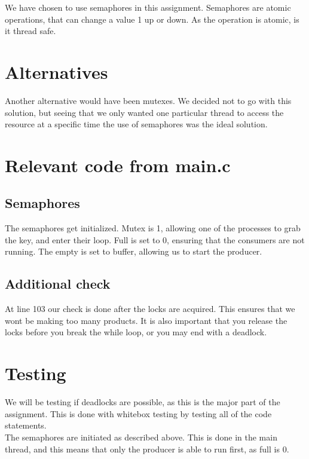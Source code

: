 We have chosen to use semaphores in this assignment. Semaphores are atomic operations, that can change a value 1 up or down. As the operation is atomic, is it thread safe.

\section{Alternatives}
Another alternative would have been mutexes. We decided not to go with this solution, but seeing that we only wanted one particular thread to access the resource at a specific time the use of semaphores was the ideal solution.

\section{Relevant code from main.c}
\subsection{Semaphores}
The semaphores get initialized.	
Mutex is 1, allowing one of the processes to grab the key, and enter their loop. Full is set to 0, ensuring that the consumers are not running. The empty is set to buffer, allowing us to start the producer.\\



\subsection{Additional check}
At line 103 our check is done after the locks are acquired. This ensures that we wont be making too many products. It is also important that you release the locks before you break the while loop, or you may end with a deadlock.




\section{Testing}

We will be testing if deadlocks are possible, as this is the major part of the assignment. This is done with whitebox testing by testing all of the code statements.\\

The semaphores are initiated as described above. This is done in the main thread, and this means that only the producer is able to run first, as full is 0.

